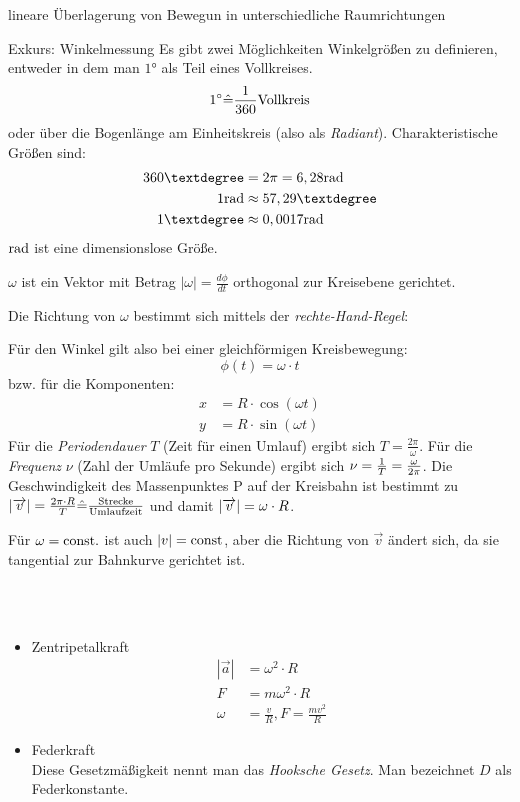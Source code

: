 \documentclass[a4paper,10pt]{scrartcl}
\begin{document}
\begin{seg}{lineare Überlagerung von Bewegun in unterschiedliche Raumrichtungen}
\begin{seg}{Exkurs: Winkelmessung}
Es gibt zwei Möglichkeiten Winkelgrößen zu definieren, entweder in dem man $1$° als Teil eines Vollkreises.
\[
1^\circ \hat = \frac{1}{360} \text{Vollkreis}
\]
oder über die Bogenlänge am Einheitskreis (also als \emph{Radiant}). Charakteristische Größen sind:
\begin{align*}
360°&=2\pi=6,28 \rad\\
1 \rad &\approx 57,29°\\
1°&\approx 0,0017 \rad
\end{align*}
$\text{rad}$ ist eine dimensionslose Größe.
\end{seg}
$\omega$ ist ein Vektor mit Betrag $|\omega|=\frac{d\phi}{dt}$ orthogonal zur Kreisebene gerichtet.
\begin{figure}[h]
\end{figure}
Die Richtung von $\omega$ bestimmt sich mittels der \emph{rechte-Hand-Regel}:
\begin{figure}[h]
\end{figure}
Für den Winkel gilt also bei einer gleichförmigen Kreisbewegung:
\[
\phi(t)=\omega\cdot t
\]
bzw. für die Komponenten:
\begin{align*}
x&=R\cdot \cos(\omega t)\\
y&=R\cdot \sin(\omega t)
\end{align*}
Für die \emph{Periodendauer} $T$ (Zeit für einen Umlauf) ergibt sich $T=\frac{2\pi}{\omega}$. Für die \emph{Frequenz} $\nu$ (Zahl der Umläufe pro Sekunde) ergibt sich $\nu=\frac{1}{T}=\frac{\omega}{2\pi}$. Die Geschwindigkeit des Massenpunktes P auf der Kreisbahn ist bestimmt zu $|\overrightarrow{v}|=\frac{2\pi\cdot R}{T} \hat=\frac{\text{Strecke}}{\text{Umlaufzeit}}$ und damit $|\overrightarrow{v}|=\omega \cdot R$.

Für $\omega=\text{const.}$ ist auch $|v|=\text{const}$, aber die Richtung von $\vec v$ ändert sich, da sie tangential zur Bahnkurve gerichtet ist. 
\end{seg}
\\
\\
\begin{itemize}
 \item 
\begin{seg}{Zentripetalkraft}
\\
\begin{align*}
 |\vec a|&=\omega^2\cdot R\\
F&=m\omega^2\cdot R\\
\omega&=\frac{v}{R}, F=\frac{mv^2}{R}
\end{align*}
\end{seg}
\item 
\begin{seg}{Federkraft}
 \\
Diese Gesetzmäßigkeit nennt man das \emph{Hooksche Gesetz}. Man bezeichnet $D$ als Federkonstante.
\end{seg}
\end{itemize}
\end{document}
